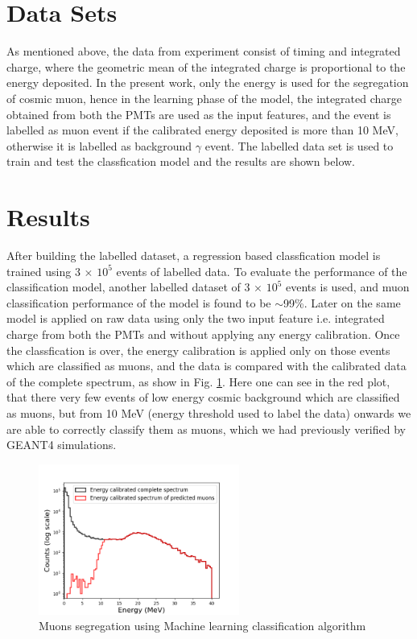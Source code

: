 \documentclass[twocolumn,amsmath,amssymb]{snp}
\begin{document}
\section*{Data Sets}
As mentioned above, the data from experiment consist of timing and integrated charge, where the geometric mean of the integrated charge is proportional to the energy deposited. In the present work, only the energy is used for the segregation of cosmic muon, hence in the learning phase of the model, the integrated charge obtained from both the PMTs are used as the input features, and the event is labelled as muon event if the calibrated energy deposited is more than 10 MeV, otherwise it is labelled as background $\gamma$ event. The labelled data set is used to train and test the classfication model and the results are shown below.
\section*{Results}
 After building the labelled dataset, a regression based classfication model is trained using 3 $\times$ $10^{5}$ events of labelled data. To evaluate the performance of the classification model, another labelled dataset of 3 $\times$ $10^{5}$ events is used, and muon classification performance of the model is found to be $\sim$99\%. Later on the same model is applied on raw data using only the two input feature i.e. integrated charge from both the PMTs and without applying any energy calibration. Once the classfication is over, the energy calibration is applied only on those events which are classified as muons, and the data is compared with the calibrated data of the complete spectrum, as show in Fig. \ref{classfication}. Here one can see in the red plot, that there very few events of low energy cosmic background which are classified as muons, but from 10 MeV (energy threshold used to label the data) onwards we are able to correctly classify them as muons, which we had previously verified by GEANT4 simulations.

\begin{figure}
\includegraphics[width=66mm]{prediction.png}%
\caption{\label{classfication} Muons segregation using Machine learning classification algorithm}
\end{figure}
\end{document}
